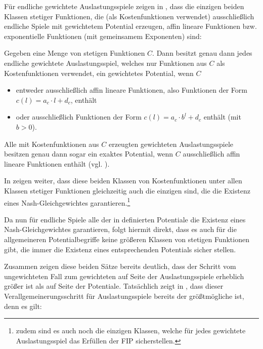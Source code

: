 Für endliche gewichtete Auslastungsspiele zeigen \citeauthor{CharExGewPotinWCG} in \cite[Theorem 3.9]{CharExGewPotinWCG}, dass die einzigen beiden Klassen stetiger Funktionen, die (als Kostenfunktionen verwendet) ausschließlich endliche Spiele mit gewichtetem Potential erzeugen, affin lineare Funktionen bzw. exponentielle Funktionen (mit gemeinsamem Exponenten) sind:

\begin{satz}\label{satz:CharExGewPotinWCG}
	Gegeben eine Menge von stetigen Funktionen $C$. Dann besitzt genau dann jedes endliche gewichtete Auslastungsspiel, welches nur Funktionen aus $C$ als Kostenfunktionen verwendet, ein gewichtetes Potential, wenn $C$
	\begin{itemize}
		\item entweder ausschließlich affin lineare Funktionen, also Funktionen der Form $c(l) = a_c \cdot l + d_c$, enthält
		\item oder ausschließlich Funktionen der Form $c(l) = a_c\cdot b^l + d_c$ enthält (mit $b > 0$).
	\end{itemize}
	Alle mit Kostenfunktionen aus $C$ erzeugten gewichteten Auslastungsspiele besitzen genau dann sogar ein exaktes Potential, wenn $C$ ausschließlich affin lineare Funktionen enthält (vgl. \cite[Theorem 3.7]{CharExGewPotinWCG}).
\end{satz}


In \cite[Theorem 5.1]{CharExNGinWCG} zeigen \citeauthor{CharExNGinWCG} weiter, dass diese beiden Klassen von Kostenfunktionen unter allen Klassen stetiger Funktionen gleichzeitig auch die einzigen sind, die die Existenz eines Nash-Gleichgewichtes garantieren.\footnote{zudem sind es auch noch die einzigen Klassen, welche für jedes gewichtete Auslastungsspiel das Erfüllen der FIP sicherstellen.}

Da nun für endliche Spiele alle der in  definierten Potentiale die Existenz eines Nash-Gleichgewichtes garantieren, folgt hiermit direkt, dass es auch für die allgemeineren Potentialbegriffe keine größeren Klassen von stetigen Funktionen gibt, die immer die Existenz eines entsprechenden Potentials sicher stellen.

Zusammen zeigen diese beiden Sätze bereits deutlich, dass der Schritt vom ungewichteten Fall zum gewichteten auf Seite der Auslastungsspiele erheblich größer ist als auf Seite der Potentiale. Tatsächlich zeigt \citeauthor{ReprOfFiniteGamesAsNCG} in \cite[Theorem 1]{ReprOfFiniteGamesAsNCG}, dass dieser Verallgemeinerungsschritt für Auslastungsspiele bereits der größtmögliche ist, denn es gilt:

